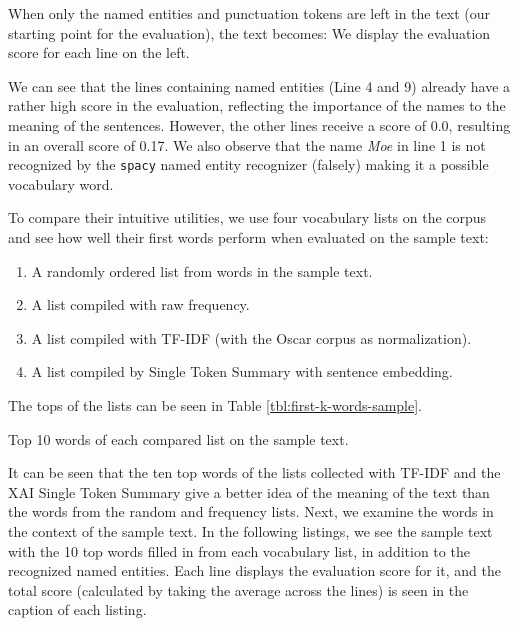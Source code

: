 

When only the named entities and punctuation tokens are left in the text (our starting point for the evaluation), the text becomes:
We display the evaluation score for each line on the left.



We can see that the lines containing named entities (Line 4 and 9) already have a rather high score in the evaluation, reflecting the importance of the names to the meaning of the sentences.
However, the other lines receive a score of 0.0, resulting in an overall score of 0.17.
We also observe that the name \textit{Moe} in line 1 is not recognized by the \texttt{spacy} named entity recognizer (falsely) making it a possible vocabulary word.

To compare their intuitive utilities, we use four vocabulary lists on the corpus and see how well their first words perform when evaluated on the sample text:
\begin{enumerate}
	\item A randomly ordered list from words in the sample text.
	\item A list compiled with raw frequency.
	\item A list compiled with TF-IDF (with the Oscar corpus as normalization).
	\item A list compiled by Single Token Summary with sentence embedding.
\end{enumerate}

The tops of the lists can be seen in Table \ref{tbl:first-k-words-sample}.

\begin{table}[H]
	\centering
	
	\caption{Top 10 words of each compared list on the sample text.}
	\label{tbl:first-k-words-sample}
\end{table}

It can be seen that the ten top words of the lists collected with TF-IDF and the XAI Single Token Summary give a better idea of the meaning of the text than the words from the random and frequency lists.
Next, we examine the words in the context of the sample text.
In the following listings, we see the sample text with the 10 top words filled in from each vocabulary list, in addition to the recognized named entities. 
Each line displays the evaluation score for it, and the total score (calculated by taking the average across the lines) is seen in the caption of each listing.

